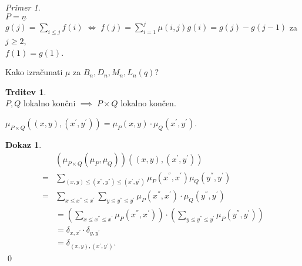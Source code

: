 \documentclass[a4paper, 12pt]{book}
\theoremstyle{definition}
\newtheorem{claim}[counter]{Trditev}
\newtheorem{pro}[counter]{Dokaz}
\theoremstyle{remark}
\newtheorem*{ex}{Primer}
\begin{document}
\begin{ex} \text{} \\
  $P = \underline{n}$ \\
  $g(j) = \sum_{i \leq j} f(i) \; \iff \; f(j) = \sum_{i=1}^j \mu(i,j) g(i) = g(j) - g(j-1)$ za $j \geq 2$, \\
  $f(1) = g(1)$.  
\end{ex}
Kako izračunati $\mu$ za $B_n, D_n, M_n, L_n(q)?$ \\
\begin{claim} \text{} \\
  $P, Q$ lokalno končni $\implies \; P \times Q$ lokalno končen.
\end{claim}
$\mu_{P \times Q} \left((x,y), (x^{'}, y^{'})\right) = \mu_P(x,y) \cdot \mu_Q(x^{'}, y^{'})$.
\begin{pro}
  \begin{align*}
    &\left(\mu_{P \times Q} (\mu_P, \mu_Q)\right) \left((x,y), (x^{'}, y^{'})\right) \\
    =& \sum_{(x,y) \leq (x^{''},y^{''}) \leq (x^{'},y^{'})} \mu_P(x^{''},x^{'}) \mu_Q(y^{''},y^{'}) \\
    =& \sum_{x \leq x^{''} \leq x^{'}} \sum_{y \leq y^{''} \leq y^{'}}
      \mu_P(x^{''}, x^{'}) \cdot \mu_Q(y^{''}, y^{'}) \\
    &= \left(\sum_{x \leq x^{''} \leq x^{'}} \mu_P(x^{''}, x^{'})\right) \cdot 
      \left(\sum_{y \leq y^{''} \leq y^{'}} \mu_P(y^{''}, y^{'})\right) \\
    &= \delta_{x,x^{'}} \cdot \delta_{y,y^{'}} \\
    &= \delta_{(x,y), (x^{'},y^{'})}.
  \end{align*}
  \qed
\end{pro}
\end{document}
